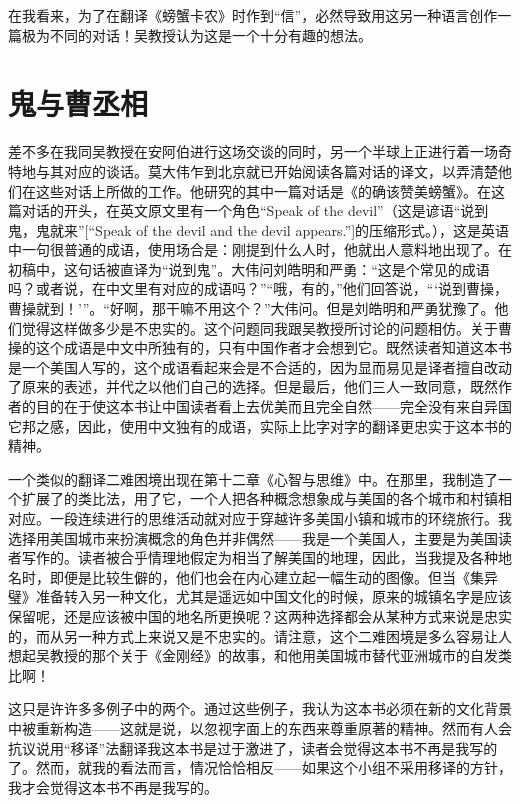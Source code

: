 在我看来，为了在翻译《螃蟹卡农》时作到“信”，必然导致用这另一种语言创作一篇极为不同的对话！吴教授认为这是一个十分有趣的想法。

\section{鬼与曹丞相}

差不多在我同吴教授在安阿伯进行这场交谈的同时，另一个半球上正进行着一场奇特地与其对应的谈话。莫大伟乍到北京就已开始阅读各篇对话的译文，以弄清楚他们在这些对话上所做的工作。他研究的其中一篇对话是《的确该赞美螃蟹》。在这篇对话的开头，在英文原文里有一个角色“Speak of the devil”（这是谚语“说到鬼，鬼就来”[“Speak of the devil and the devil appears.”]的压缩形式。），这是英语中一句很普通的成语，使用场合是：刚提到什么人时，他就出人意料地出现了。在初稿中，这句话被直译为“说到鬼”。大伟问刘皓明和严勇：“这是个常见的成语吗？或者说，在中文里有对应的成语吗？”“哦，有的，”他们回答说，“‘说到曹操，曹操就到！’”。“好啊，那干嘛不用这个？”大伟问。但是刘皓明和严勇犹豫了。他们觉得这样做多少是不忠实的。这个问题同我跟吴教授所讨论的问题相仿。关于曹操的这个成语是中文中所独有的，只有中国作者才会想到它。既然读者知道这本书是一个美国人写的，这个成语看起来会是不合适的，因为显而易见是译者擅自改动了原来的表述，并代之以他们自己的选择。但是最后，他们三人一致同意，既然作者的目的在于使这本书让中国读者看上去优美而且完全自然——完全没有来自异国它邦之感，因此，使用中文独有的成语，实际上比字对字的翻译更忠实于这本书的精神。

一个类似的翻译二难困境出现在第十二章《心智与思维》中。在那里，我制造了一个扩展了的类比法，用了它，一个人把各种概念想象成与美国的各个城市和村镇相对应。一段连续进行的思维活动就对应于穿越许多美国小镇和城市的环绕旅行。我选择用美国城市来扮演概念的角色并非偶然——我是一个美国人，主要是为美国读者写作的。读者被合乎情理地假定为相当了解美国的地理，因此，当我提及各种地名时，即便是比较生僻的，他们也会在内心建立起一幅生动的图像。但当《集异璧》准备转入另一种文化，尤其是遥远如中国文化的时候，原来的城镇名字是应该保留呢，还是应该被中国的地名所更换呢？这两种选择都会从某种方式来说是忠实的，而从另一种方式上来说又是不忠实的。请注意，这个二难困境是多么容易让人想起吴教授的那个关于《金刚经》的故事，和他用美国城市替代亚洲城市的自发类比啊！

这只是许许多多例子中的两个。通过这些例子，我认为这本书必须在新的文化背景中被重新构造——这就是说，以忽视字面上的东西来尊重原著的精神。然而有人会抗议说用“移译”法翻译我这本书是过于激进了，读者会觉得这本书不再是我写的了。然而，就我的看法而言，情况恰恰相反——如果这个小组不采用移译的方针，我才会觉得这本书不再是我写的。

